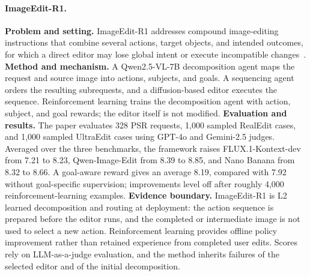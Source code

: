 \paragraph{ImageEdit-R1.}
\textbf{Problem and setting.} ImageEdit-R1 addresses compound image-editing instructions that combine several actions, target objects, and intended outcomes, for which a direct editor may lose global intent or execute incompatible changes~\cite{avg260308059}. \textbf{Method and mechanism.} A Qwen2.5-VL-7B decomposition agent maps the request and source image into actions, subjects, and goals. A sequencing agent orders the resulting subrequests, and a diffusion-based editor executes the sequence. Reinforcement learning trains the decomposition agent with action, subject, and goal rewards; the editor itself is not modified. \textbf{Evaluation and results.} The paper evaluates 328 PSR requests, 1,000 sampled RealEdit cases, and 1,000 sampled UltraEdit cases using GPT-4o and Gemini-2.5 judges. Averaged over the three benchmarks, the framework raises FLUX.1-Kontext-dev from 7.21 to 8.23, Qwen-Image-Edit from 8.39 to 8.85, and Nano Banana from 8.32 to 8.66. A goal-aware reward gives an average 8.19, compared with 7.92 without goal-specific supervision; improvements level off after roughly 4,000 reinforcement-learning examples. \textbf{Evidence boundary.} ImageEdit-R1 is L2 learned decomposition and routing at deployment: the action sequence is prepared before the editor runs, and the completed or intermediate image is not used to select a new action. Reinforcement learning provides offline policy improvement rather than retained experience from completed user edits. Scores rely on LLM-as-a-judge evaluation, and the method inherits failures of the selected editor and of the initial decomposition.

